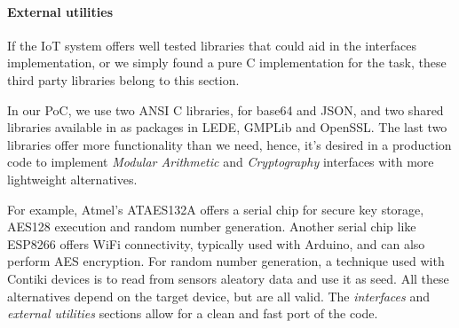 \paragraph{External utilities}

If the IoT system offers well tested libraries that could aid in the interfaces implementation, or we simply found a pure C implementation for the task, these third party libraries belong to this section.

In our PoC, we use two ANSI C libraries, for base64 and JSON, and two shared libraries available in as packages in LEDE, GMPLib and OpenSSL. The last two libraries offer more functionality than we need, hence, it's desired in a production code to implement \textit{Modular Arithmetic} and \textit{Cryptography} interfaces with more lightweight alternatives.

For example, Atmel's ATAES132A \citep{ATAES132A}
offers a serial chip for secure key storage, AES128 execution and random number generation. Another serial chip like ESP8266 offers WiFi connectivity, typically used with Arduino, and can also perform AES encryption. For random number generation, a technique used with Contiki devices is to read from sensors aleatory data and use it as seed. All these alternatives depend on the target device, but are all valid. The \textit{interfaces} and \textit{external utilities} sections allow for a clean and fast port of the code.


